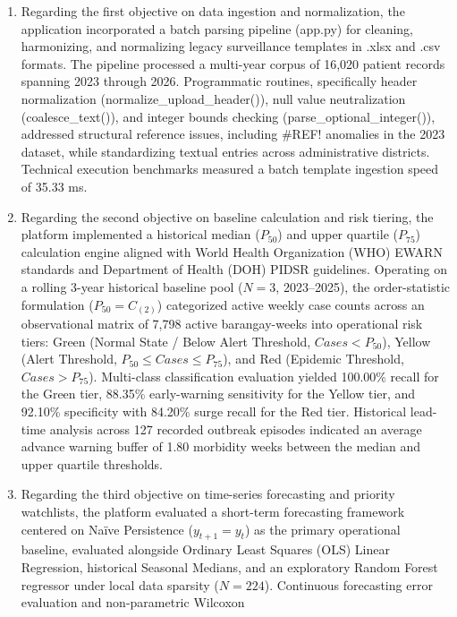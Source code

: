 \documentclass[
]{article}
\begin{document}
\begin{enumerate}
\def\labelenumi{\arabic{enumi}.}
\item
  Regarding the first objective on data ingestion and normalization, the
  application incorporated a batch parsing pipeline (app.py) for
  cleaning, harmonizing, and normalizing legacy surveillance templates
  in .xlsx and .csv formats. The pipeline processed a multi-year corpus
  of 16,020 patient records spanning 2023 through 2026. Programmatic
  routines, specifically header normalization
  (normalize\_upload\_header()), null value neutralization
  (coalesce\_text()), and integer bounds checking
  (parse\_optional\_integer()), addressed structural reference issues,
  including \#REF! anomalies in the 2023 dataset, while standardizing
  textual entries across administrative districts. Technical execution
  benchmarks measured a batch template ingestion speed of 35.33 ms.
\item
  Regarding the second objective on baseline calculation and risk
  tiering, the platform implemented a historical median (\(P_{50}\)) and
  upper quartile (\(P_{75}\)) calculation engine aligned with World
  Health Organization (WHO) EWARN standards and Department of Health
  (DOH) PIDSR guidelines. Operating on a rolling 3-year historical
  baseline pool (\(N = 3\), 2023--2025), the order-statistic formulation
  (\(P_{50} = C_{(2)}\)) categorized active weekly case counts across an
  observational matrix of 7,798 active barangay-weeks into operational
  risk tiers: Green (Normal State / Below Alert Threshold,
  \(Cases < P_{50}\)), Yellow (Alert Threshold,
  \(P_{50} \leq Cases \leq P_{75}\)), and Red (Epidemic Threshold,
  \(Cases > P_{75}\)). Multi-class classification evaluation yielded
  100.00\% recall for the Green tier, 88.35\% early-warning sensitivity
  for the Yellow tier, and 92.10\% specificity with 84.20\% surge recall
  for the Red tier. Historical lead-time analysis across 127 recorded
  outbreak episodes indicated an average advance warning buffer of 1.80
  morbidity weeks between the median and upper quartile thresholds.
\item
  Regarding the third objective on time-series forecasting and priority
  watchlists, the platform evaluated a short-term forecasting framework
  centered on Naïve Persistence (\(y_{t + 1} = y_{t}\)) as the primary
  operational baseline, evaluated alongside Ordinary Least Squares (OLS)
  Linear Regression, historical Seasonal Medians, and an exploratory
  Random Forest regressor under local data sparsity (\(N = 224\)).
  Continuous forecasting error evaluation and non-parametric Wilcoxon

\end{enumerate}
\end{document}
